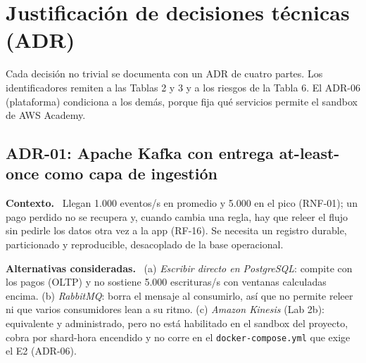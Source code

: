 \documentclass[12pt,letterpaper]{article}
\newcommand{\code}[1]{{\small\texttt{#1}}}
\newcommand{\adrpart}[1]{\textbf{#1.}~}
\begin{document}
{\begin{landscape}
\begin{center}
BZ0gRcDYpAiq7rLFk4ZBUQNWMZqBSTRFAYEAWfeiy6WBOJnymU2KF4NmcAX8mXohYiLzDA9s1O4v89wKXDBWbedgdPouDj72fCWTF4wMQgeDHwCeetx5XMFHVpJlae1vvGvW9h0rU77MStT0zjiiXP2QlapH9tSHjsNLrVIyrU\%2FEKRg\%2Be42V6lOlfK\%2FLvT2p8UBy0YUlGOG1LMGK9wKdoDAJ3gx7ZHE3TsaCIXcpmaweSgyidmgt0j5HFmY8Sd4miPWBQEI\%2BIIA2QGObsZxihcnrSHlvtTdpBFT0eHb7FTOPZeRaXK\%2F7hyw3HCRn2qYppF2D\%2Bxe2cwivwUhT8xdP40AW\%2BBCvM64CTZX9Phid9CwfpDmC21NMTny8FqgKWbeSOwIheMn8KwB7NL\%2FlrfyeTHfZEG65Xv6dtuP5rOiVEYUQ\%2BXqV6CJayB1Kahkoly3lNctZakQxIqPsVOjIK5r\%2FjZmIy7nHIxiN92GeWPL36KJofjTqfjt6hJKgyy0HBw7Yvy0EWQVTIyNOQ7YAcRog6Ch920HR9uEZ0h5uedD1AVo197iIyOqQrFv8D}{abrir el diagrama en app.diagrams.net}. Archivo fuente: \path{arquitectura.drawio}.
\end{center}
\end{landscape}
\restoregeometry
}

\section{Justificación de decisiones técnicas (ADR)}

Cada decisión no trivial se documenta con un ADR de cuatro partes. Los identificadores remiten a las Tablas 2 y 3 y a los riesgos de la Tabla 6. El ADR-06 (plataforma) condiciona a los demás, porque fija qué servicios permite el sandbox de AWS Academy.

\subsection*{ADR-01: Apache Kafka con entrega at-least-once como capa de ingestión}

\adrpart{Contexto} Llegan 1.000 eventos/s en promedio y 5.000 en el pico (RNF-01); un pago perdido no se recupera y, cuando cambia una regla, hay que releer el flujo sin pedirle los datos otra vez a la app (RF-16). Se necesita un registro durable, particionado y reproducible, desacoplado de la base operacional.

\adrpart{Alternativas consideradas} (a) \emph{Escribir directo en PostgreSQL}: compite con los pagos (OLTP) y no sostiene 5.000 escrituras/s con ventanas calculadas encima. (b) \emph{RabbitMQ}: borra el mensaje al consumirlo, así que no permite releer ni que varios consumidores lean a su ritmo. (c) \emph{Amazon Kinesis} (Lab 2b): equivalente y administrado, pero no está habilitado en el sandbox del proyecto, cobra por shard-hora encendido y no corre en el \code{docker-compose.yml} que exige el E2 (ADR-06).
\end{document}
